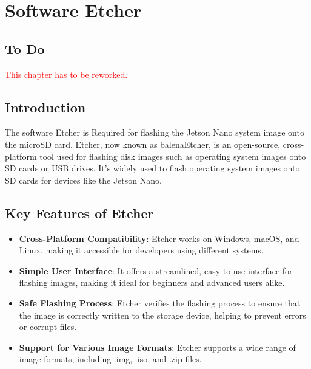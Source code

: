 %
%


\chapter{Software Etcher}

\section{To Do}

\textcolor{red}{This chapter has to be reworked.}

\section{Introduction}


The software Etcher is Required for flashing the Jetson Nano system image onto the microSD card. Etcher, now known as balenaEtcher, is an open-source, cross-platform tool used for flashing disk images such as operating system images onto SD cards or USB drives. It's widely used to flash operating system images onto SD cards for devices like the Jetson Nano. \cite{Balena:2025}



\section{Key Features of Etcher}
\begin{itemize}
	\item \textbf{Cross-Platform Compatibility}: Etcher works on Windows, macOS, and Linux, making it accessible for developers using different systems.
	\item \textbf{Simple User Interface}: It offers a streamlined, easy-to-use interface for flashing images, making it ideal for beginners and advanced users alike.
	\item \textbf{Safe Flashing Process}: Etcher verifies the flashing process to ensure that the image is correctly written to the storage device, helping to prevent errors or corrupt files.
	\item \textbf{Support for Various Image Formats}: Etcher supports a wide range of image formats, including .img, .iso, and .zip files.
\end{itemize}

